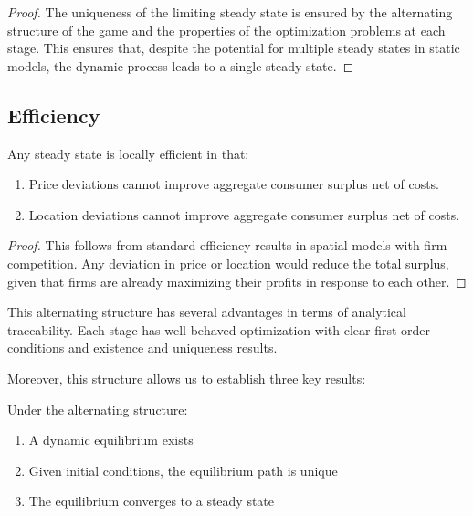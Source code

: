 \begin{proof}
The uniqueness of the limiting steady state is ensured by the alternating structure of the game and the properties of the optimization problems at each stage. This ensures that, despite the potential for multiple steady states in static models, the dynamic process leads to a single steady state.
\end{proof}

\subsection{Efficiency}

\begin{proposition}[Efficiency]  
Any steady state is locally efficient in that:
\begin{enumerate}
    \item Price deviations cannot improve aggregate consumer surplus net of costs.
    \item Location deviations cannot improve aggregate consumer surplus net of costs.
\end{enumerate}
\end{proposition}

\begin{proof}
This follows from standard efficiency results in spatial models with firm competition. Any deviation in price or location would reduce the total surplus, given that firms are already maximizing their profits in response to each other.
\end{proof}







This alternating structure has several advantages in terms of analytical traceability. Each stage has well-behaved optimization with clear first-order conditions and existence and uniqueness results.

Moreover, this structure allows us to establish three key results:

\begin{proposition}
Under the alternating structure:
\begin{enumerate}
    \item A dynamic equilibrium exists
    \item Given initial conditions, the equilibrium path is unique
    \item The equilibrium converges to a steady state
\end{enumerate}
\end{proposition}

